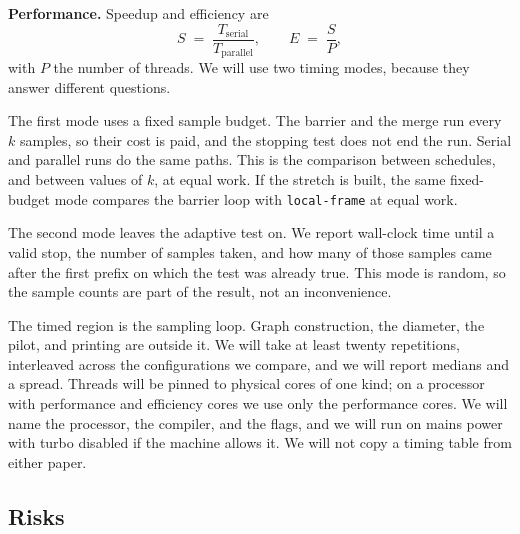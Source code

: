 \documentclass[11pt]{article}
\begin{document}
\textbf{Performance.} Speedup and efficiency are
\[
S \;=\; \frac{T_{\mathrm{serial}}}{T_{\mathrm{parallel}}}, \qquad E \;=\; \frac{S}{P},
\]
with $P$ the number of threads. We will use two timing modes, because they answer different questions.

The first mode uses a fixed sample budget. The barrier and the merge run every $k$ samples, so their cost is paid, and the stopping test does not end the run. Serial and parallel runs do the same paths. This is the comparison between schedules, and between values of $k$, at equal work. If the stretch is built, the same fixed-budget mode compares the barrier loop with \texttt{local-frame} at equal work.

The second mode leaves the adaptive test on. We report wall-clock time until a valid stop, the number of samples taken, and how many of those samples came after the first prefix on which the test was already true. This mode is random, so the sample counts are part of the result, not an inconvenience.

The timed region is the sampling loop. Graph construction, the diameter, the pilot, and printing are outside it. We will take at least twenty repetitions, interleaved across the configurations we compare, and we will report medians and a spread. Threads will be pinned to physical cores of one kind; on a processor with performance and efficiency cores we use only the performance cores. We will name the processor, the compiler, and the flags, and we will run on mains power with turbo disabled if the machine allows it. We will not copy a timing table from either paper.

\subsection{Risks}
\end{document}
